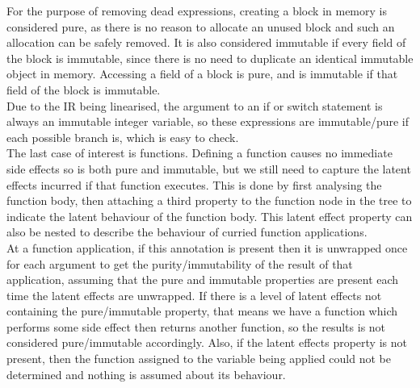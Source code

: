 For the purpose of removing dead expressions, creating a block in memory is considered pure, as there is no reason to allocate an unused block and such an allocation can be safely removed. It is also considered immutable if every field of the block is immutable, since there is no need to duplicate an identical immutable object in memory. Accessing a field of a block is pure, and is immutable if that field of the block is immutable. \\
Due to the IR being linearised, the argument to an if or switch statement is always an immutable integer variable, so these expressions are immutable/pure if each possible branch is, which is easy to check. \\
The last case of interest is functions. Defining a function causes no immediate side effects so is both pure and immutable, but we still need to capture the latent effects incurred if that function executes. This is done by first analysing the function body, then attaching a third property to the function node in the tree to indicate the latent behaviour of the function body. This latent effect property can also be nested to describe the behaviour of curried function applications. \\
 At a function application, if this annotation is present then it is unwrapped once for each argument to get the purity/immutability of the result of that application, assuming that the pure and immutable properties are present each time the latent effects are unwrapped. If there is a level of latent effects not containing the pure/immutable property, that means we have a function which performs some side effect then returns another function, so the results is not considered pure/immutable accordingly. Also, if the latent effects property is not present, then the function assigned to the variable being applied could not be determined and nothing is assumed about its behaviour. %



